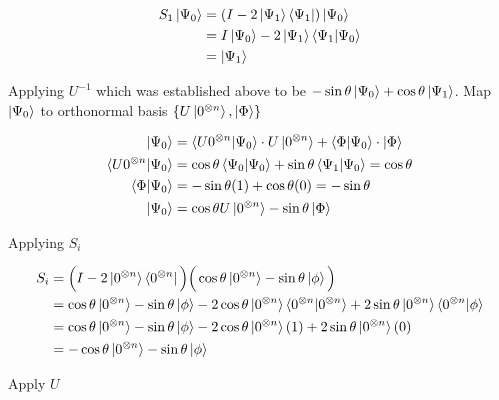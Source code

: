 \documentclass[11pt]{article}
\newcommand{\sinth}{\sin\theta}
\newcommand{\costh}{\cos\theta}
\newcommand{\ztimesn}{0^{\otimes n}}
\begin{document}
\begin{enumerate}
\begin{enumerate}
		            \begin{align*}
			            S_{1}\ket{\Psi_0} & = (I - 2\ket{\Psi_1}\bra{\Psi_1})\ket{\Psi_0}           \\
			                              & = I\ket{\Psi_0} - 2\ket{\Psi_1}\braket{\Psi_1 | \Psi_0} \\
			                              & = \ket{\Psi_1}
		            \end{align*}

		            Applying $U^{-1}$ which was established above to be $-\sinth\ket{\Psi_0} + \costh\ket{\Psi_1}$. Map $\ket{\Psi_0}$ to orthonormal basis $\{U\ket{\ztimesn}, \ket{\Phi}\}$

		            \begin{align*}
			            \ket{\Psi_0}                & = \braket{U\ztimesn|\Psi_0} \cdot U\ket{\ztimesn} + \braket{\Phi | \Psi_0} \cdot \ket{\Phi} \\
			            \braket{U\ztimesn | \Psi_0} & = \costh\braket{\Psi_0 | \Psi_0} + \sinth \braket{\Psi_1 | \Psi_0} = \costh                 \\
			            \braket{\Phi | \Psi_0}      & = -\sinth(1) + \costh(0) = -\sinth                                                          \\
			            \ket{\Psi_0}                & = \costh U\ket{\ztimesn} - \sinth\ket{\Phi}
		            \end{align*}

		            Applying $S_i$

		            \begin{align*}
			            S_i & = \Big(I - 2 \ket{\ztimesn}\bra{\ztimesn}\Big) \Big(\costh \ket{\ztimesn} - \sinth \ket{\phi}\Big)                                            \\
			                & = \costh\ket{\ztimesn} - \sinth\ket{\phi} - 2\costh\ket{\ztimesn}\braket{\ztimesn | \ztimesn} + 2\sinth\ket{\ztimesn}\braket{\ztimesn | \phi} \\
			                & = \costh\ket{\ztimesn} - \sinth\ket{\phi} -2\costh\ket{\ztimesn}(1) + 2\sinth\ket{\ztimesn}(0)                                                \\
			                & = -\costh\ket{\ztimesn} - \sinth\ket{\phi}
		            \end{align*}

		            Apply $U$


\end{enumerate}
\end{enumerate}
\end{document}
